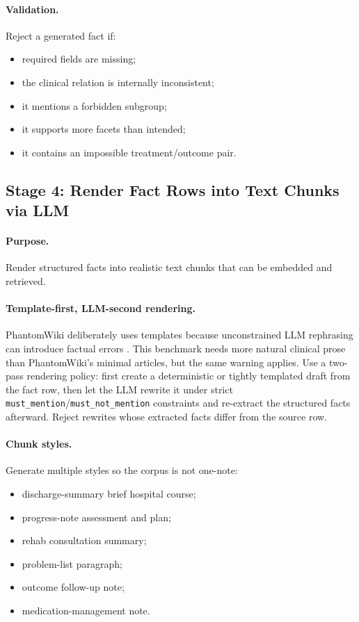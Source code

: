 \documentclass[11pt,a4paper]{article}
\newcommand{\field}[1]{\texttt{#1}}
\newcommand{\stage}[2]{\subsection{\textcolor{betterblue}{#1}: #2}}
\begin{document}
\paragraph{Validation.}
Reject a generated fact if:

\begin{itemize}[leftmargin=*]
	\item required fields are missing;
	\item the clinical relation is internally inconsistent;
	\item it mentions a forbidden subgroup;
	\item it supports more facets than intended;
	\item it contains an impossible treatment/outcome pair.
\end{itemize}

\stage{Stage 4}{Render Fact Rows into Text Chunks via LLM}

\paragraph{Purpose.}
Render structured facts into realistic text chunks that can be embedded and retrieved.

\paragraph{Template-first, LLM-second rendering.}
PhantomWiki deliberately uses templates because unconstrained LLM rephrasing can introduce factual errors \citep{gong2025phantomwiki}. This benchmark needs more natural clinical prose than PhantomWiki's minimal articles, but the same warning applies. Use a two-pass rendering policy: first create a deterministic or tightly templated draft from the fact row, then let the LLM rewrite it under strict \field{must\_mention}/\field{must\_not\_mention} constraints and re-extract the structured facts afterward. Reject rewrites whose extracted facts differ from the source row.

\paragraph{Chunk styles.}
Generate multiple styles so the corpus is not one-note:

\begin{itemize}[leftmargin=*]
	\item discharge-summary brief hospital course;
	\item progress-note assessment and plan;
	\item rehab consultation summary;
	\item problem-list paragraph;
	\item outcome follow-up note;
	\item medication-management note.
\end{itemize}
\end{document}
